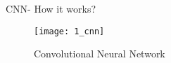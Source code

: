 \begin{frame}[t]{CNN- How it works?}
    \begin{figure}[h]
        
        \texttt{[image: 1\_cnn]}
        \caption{Convolutional Neural Network \cite{CNN}}   
    \end{figure}
\end{frame}